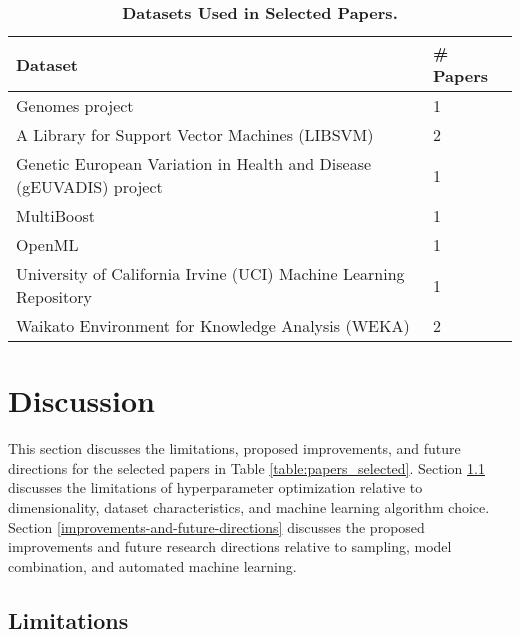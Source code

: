 \begin{table}
\centering
\caption{\textbf{Datasets Used in Selected Papers.}}
\label{table:datasets}
\begin{tabular}{p{2.25in}p{0.75in}}
	\toprule
	\textbf{Dataset} & \textbf{\# Papers} \\
	\midrule \addlinespace
	1000 Genomes project \cite{Sudmant:2015} & 1 \cite{Quitadamo:2017}
	\addlinespace\\ 
	\midrule \addlinespace
	A Library for Support Vector Machines (LIBSVM) \cite{Chang:2011} & 2 \cite{Wistuba:2015} \cite{Wistuba:2016}
	\addlinespace\\ 
	\midrule \addlinespace
	Genetic European Variation in Health and Disease (gEUVADIS) project \cite{Lappalainen:2013} & 1 \cite{Quitadamo:2017}
	\addlinespace\\ 
	\midrule \addlinespace
	MultiBoost \cite{Benbouzid:2012} & 1 \cite{Wistuba:2015}
	\addlinespace \\
	\midrule \addlinespace
	OpenML \cite{Vanschoren:2014} & 1 \cite{Levesque:2017}
	\addlinespace \\
	\midrule \addlinespace
	University of California Irvine (UCI) Machine Learning Repository \cite{Lichman:2013} & 1 \cite{Levesque:2017}
	\addlinespace \\
	\midrule \addlinespace
	Waikato Environment for Knowledge Analysis (WEKA) \cite{Hall:2009} & 2 \cite{Schilling:2015} \cite{Wistuba:2016}
	\addlinespace \\
	\bottomrule
\end{tabular}
\end{table}




\section{Discussion} \label{discussion}

This section discusses the limitations, proposed improvements, and future directions for the selected papers in Table \ref{table:papers_selected}. Section \ref{limitations} discusses the limitations of hyperparameter optimization relative to dimensionality, dataset characteristics, and machine learning algorithm choice. Section \ref{improvements-and-future-directions} discusses the proposed improvements and future research directions relative to sampling, model combination, and automated machine learning.


\subsection{Limitations} \label{limitations}

